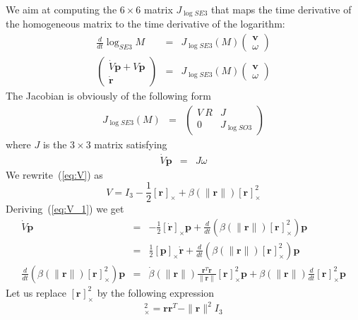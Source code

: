 \documentclass {article}
\newcommand\rot{\mathbf{r}}
\newcommand\rcross[1]{[\rot_{#1}]_{\times}}
\newcommand\normr{\|\rot\|}
\newcommand\JlogSO[1]{J_{\log SO#1}}
\newcommand\logSE[1]{\log_{SE#1}}
\newcommand\JlogSE[1]{J_{\log SE#1}}
\begin{document}
We aim at computing the $6\times 6$ matrix $\JlogSE{3}$ that maps the time derivative of the homogeneous matrix to the time derivative of the logarithm:
\begin{eqnarray}
\frac{d}{dt} \logSE{3} M &=& \JlogSE{3} (M) \left(\begin{array}{c}\mathbf{v}\\ \omega\end{array}\right)\\
\left(\begin{array}{c}\dot{V}\mathbf{p} + V\mathbf{\dot{p}} \\
\mathbf{\dot{r}}\end{array}\right) &=& \JlogSE{3} (M) \left(\begin{array}{c}\mathbf{v}\\ \omega\end{array}\right)
\end{eqnarray}
The Jacobian is obviously of the following form
\begin{eqnarray}
\JlogSE{3} (M) &=&\left(\begin{array}{cc}
V\ R & J \\ 0 & \JlogSO{3}
\end{array}\right)
\end{eqnarray}
where $J$ is the $3\times 3$ matrix satisfying
\begin{eqnarray}
\dot{V} \mathbf{p} &=& J\omega
\end{eqnarray}
We rewrite~(\ref{eq:V}) as
\begin{equation}\label{eq:V_1}
V = I_3 -\frac{1}{2}\rcross{} +  \beta (\normr)\rcross{}^2
\end{equation}
Deriving~(\ref{eq:V_1}) we get
\begin{eqnarray}
\dot{V} \mathbf{p} &=& -\frac{1}{2}[\dot{\rot}]_{\times}\mathbf{p} +  \frac{d}{dt}\left(\beta (\normr)\rcross{}^2 \right)\mathbf{p}\\
\label{eq:1}
 &=& \frac{1}{2}[\mathbf{p}]_{\times}\dot{\rot} + \frac{d}{dt}\left(\beta (\normr)\rcross{}^2 \right)\mathbf{p}\\
\frac{d}{dt}\left(\beta (\normr)\rcross{}^2 \right)\mathbf{p} &=&
\dot{\beta} (\normr) \frac{\rot^T\dot{\rot}}{\normr}\rcross{}^2\mathbf{p} +
\beta (\normr)\frac{d}{dt}\rcross{}^2 \mathbf{p}
\end{eqnarray}
Let us replace $\rcross{}^2$ by the following expression
\begin{equation}
\rcross{}^2=\rot\rot^T - \normr^2 I_3
\end{equation}
\end{document}
